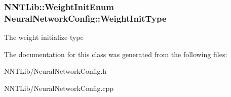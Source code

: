 \subsubsection[{Weight\+Init\+Type}]{\setlength{\rightskip}{0pt plus 5cm}N\+N\+T\+Lib\+::\+Weight\+Init\+Enum Neural\+Network\+Config\+::\+Weight\+Init\+Type}\label{class_neural_network_config_ac387c49af177bd1c2d122fdab2250ea3}


The weight initialize type 



The documentation for this class was generated from the following files\+:\begin{DoxyCompactItemize}
\item 
N\+N\+T\+Lib/Neural\+Network\+Config.\+h\item 
N\+N\+T\+Lib/Neural\+Network\+Config.\+cpp\end{DoxyCompactItemize}
